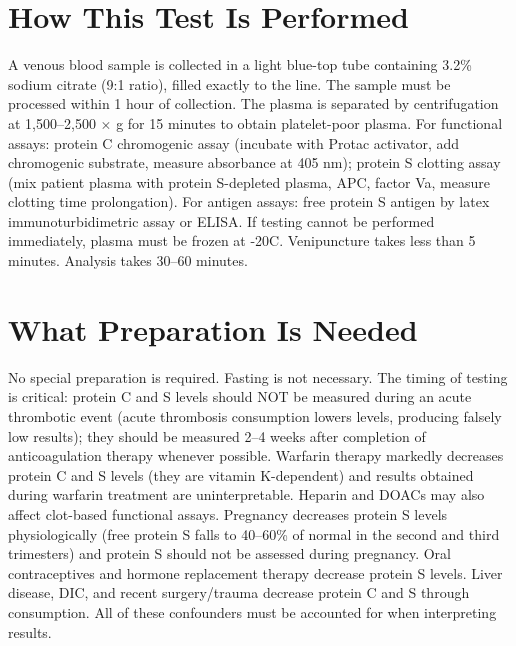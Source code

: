 \section*{How This Test Is Performed}
A venous blood sample is collected in a light blue-top tube containing 3.2\% sodium citrate (9:1 ratio), filled exactly to the line. The sample must be processed within 1 hour of collection. The plasma is separated by centrifugation at 1,500--2,500 $\times$ g for 15 minutes to obtain platelet-poor plasma. For functional assays: protein C chromogenic assay (incubate with Protac activator, add chromogenic substrate, measure absorbance at 405 nm); protein S clotting assay (mix patient plasma with protein S-depleted plasma, APC, factor Va, measure clotting time prolongation). For antigen assays: free protein S antigen by latex immunoturbidimetric assay or ELISA. If testing cannot be performed immediately, plasma must be frozen at -20\textdegree{}C. Venipuncture takes less than 5 minutes. Analysis takes 30--60 minutes.

\section*{What Preparation Is Needed}
No special preparation is required. Fasting is not necessary. The timing of testing is critical: protein C and S levels should NOT be measured during an acute thrombotic event (acute thrombosis consumption lowers levels, producing falsely low results); they should be measured 2--4 weeks after completion of anticoagulation therapy whenever possible. Warfarin therapy markedly decreases protein C and S levels (they are vitamin K-dependent) and results obtained during warfarin treatment are uninterpretable. Heparin and DOACs may also affect clot-based functional assays. Pregnancy decreases protein S levels physiologically (free protein S falls to 40--60\% of normal in the second and third trimesters) and protein S should not be assessed during pregnancy. Oral contraceptives and hormone replacement therapy decrease protein S levels. Liver disease, DIC, and recent surgery/trauma decrease protein C and S through consumption. All of these confounders must be accounted for when interpreting results.

